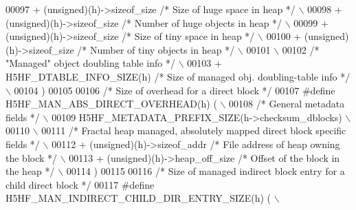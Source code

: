 \begin{DoxyCode}
00097 \textcolor{preprocessor}{    + (unsigned)(h)->sizeof\_size }\textcolor{comment}{/* Size of huge space in heap */}\textcolor{preprocessor}{             \(\backslash\)}
00098 \textcolor{preprocessor}{    + (unsigned)(h)->sizeof\_size }\textcolor{comment}{/* Number of huge objects in heap */}\textcolor{preprocessor}{         \(\backslash\)}
00099 \textcolor{preprocessor}{    + (unsigned)(h)->sizeof\_size }\textcolor{comment}{/* Size of tiny space in heap */}\textcolor{preprocessor}{             \(\backslash\)}
00100 \textcolor{preprocessor}{    + (unsigned)(h)->sizeof\_size }\textcolor{comment}{/* Number of tiny objects in heap */}\textcolor{preprocessor}{         \(\backslash\)}
00101 \textcolor{preprocessor}{                                                                              \(\backslash\)}
00102 \textcolor{preprocessor}{    }\textcolor{comment}{/* "Managed" object doubling table info */}\textcolor{preprocessor}{                                \(\backslash\)}
00103 \textcolor{preprocessor}{    + H5HF\_DTABLE\_INFO\_SIZE(h) }\textcolor{comment}{/* Size of managed obj. doubling-table info */}\textcolor{preprocessor}{ \(\backslash\)}
00104 \textcolor{preprocessor}{    )}
00105 
00106 \textcolor{comment}{/* Size of overhead for a direct block */}
00107 \textcolor{preprocessor}{#define H5HF\_MAN\_ABS\_DIRECT\_OVERHEAD(h) (                                     \(\backslash\)}
00108 \textcolor{preprocessor}{    }\textcolor{comment}{/* General metadata fields */}\textcolor{preprocessor}{                                             \(\backslash\)}
00109 \textcolor{preprocessor}{    H5HF\_METADATA\_PREFIX\_SIZE(h->checksum\_dblocks)                            \(\backslash\)}
00110 \textcolor{preprocessor}{                                                                              \(\backslash\)}
00111 \textcolor{preprocessor}{    }\textcolor{comment}{/* Fractal heap managed, absolutely mapped direct block specific fields */}\textcolor{preprocessor}{ \(\backslash\)}
00112 \textcolor{preprocessor}{    + (unsigned)(h)->sizeof\_addr          }\textcolor{comment}{/* File address of heap owning the block */}\textcolor{preprocessor}{ \(\backslash\)}
00113 \textcolor{preprocessor}{    + (unsigned)(h)->heap\_off\_size        }\textcolor{comment}{/* Offset of the block in the heap */}\textcolor{preprocessor}{ \(\backslash\)}
00114 \textcolor{preprocessor}{    )}
00115 
00116 \textcolor{comment}{/* Size of managed indirect block entry for a child direct block */}
00117 \textcolor{preprocessor}{#define H5HF\_MAN\_INDIRECT\_CHILD\_DIR\_ENTRY\_SIZE(h) (                           \(\backslash\)}

\end{DoxyCode}

